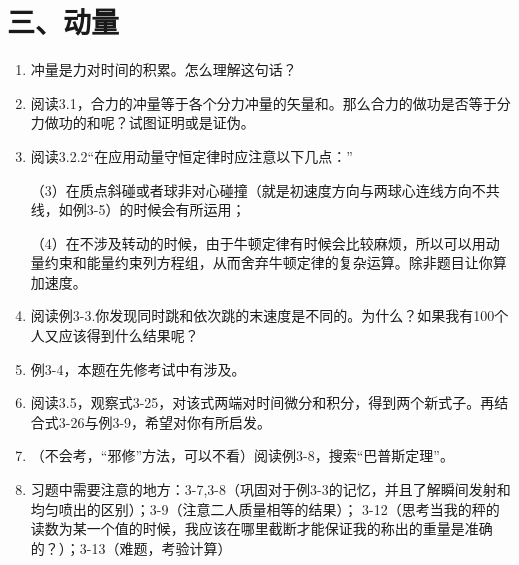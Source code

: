 \documentclass[12pt,a4paper]{article}
\begin{document}
\section{三、动量}
\begin{enumerate}[label=\arabic*.,leftmargin=*]
    \item 冲量是力对时间的积累。怎么理解这句话？

    \item 阅读3.1，合力的冲量等于各个分力冲量的矢量和。那么合力的做功是否等于分力做功的和呢？试图证明或是证伪。

    \item 阅读3.2.2“在应用动量守恒定律时应注意以下几点：”
    
    （3）在质点斜碰或者球非对心碰撞（就是初速度方向与两球心连线方向不共线，如例3-5）的时候会有所运用；
    
    （4）在不涉及转动的时候，由于牛顿定律有时候会比较麻烦，所以可以用动量约束和能量约束列方程组，从而舍弃牛顿定律的复杂运算。除非题目让你算加速度。

    \item 阅读例3-3.你发现同时跳和依次跳的末速度是不同的。为什么？如果我有100个人又应该得到什么结果呢？

    \item 例3-4，本题在先修考试中有涉及。

    \item 阅读3.5，观察式3-25，对该式两端对时间微分和积分，得到两个新式子。再结合式3-26与例3-9，希望对你有所启发。

    \item （不会考，“邪修”方法，可以不看）阅读例3-8，搜索“巴普斯定理”。

    \item 习题中需要注意的地方：3-7,3-8（巩固对于例3-3的记忆，并且了解瞬间发射和均匀喷出的区别）；3-9（注意二人质量相等的结果）；
    3-12（思考当我的秤的读数为某一个值的时候，我应该在哪里截断才能保证我的称出的重量是准确的？）；3-13（难题，考验计算）
\end{enumerate}
\end{document}
